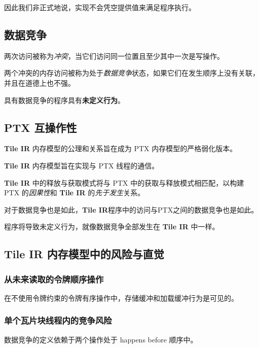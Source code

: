 \documentclass{article}
\begin{document}
因此我们非正式地说，实现不会凭空提供值来满足程序执行。



\subsection{数据竞争}

两次访问被称为\textit{冲突}，当它们访问同一位置且至少其中一次是写操作。


两个冲突的内存访问被称为处于\textit{数据竞争}状态，如果它们在发生顺序上没有关联，并且在道德上也不强。


具有数据竞争的程序具有\textbf{未定义行为}。



\subsection{PTX 互操作性}

\textbf{Tile IR} 内存模型的公理和关系旨在成为 PTX 内存模型的严格弱化版本。


\textbf{Tile IR} 内存模型旨在实现与 PTX 线程的通信。

\textbf{Tile IR} 中的释放与获取模式将与 PTX 中的获取与释放模式相匹配，以构建 PTX 的\textit{因果性}和 \textbf{Tile IR} 的\textit{先于发生}关系。


对于数据竞争也是如此，\textbf{Tile IR}程序中的访问与PTX之间的数据竞争也是如此。

程序将导致未定义行为，就像数据竞争全部发生在 \textbf{Tile IR} 中一样。



\subsection{\textbf{Tile IR} 内存模型中的风险与直觉}

\subsubsection{从未来读取的令牌顺序操作}

在不使用令牌约束的令牌有序操作中，存储缓冲和加载缓冲行为是可见的。



\subsubsection{单个瓦片块线程内的竞争风险}

数据竞争的定义依赖于两个操作处于 happens before 顺序中。
\end{document}
